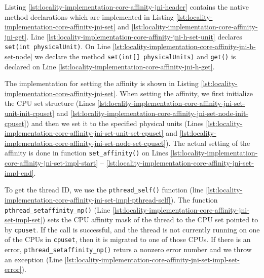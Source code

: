 

Listing \ref{lst:locality-implementation-core-affinity-jni-header}
contains the native method declarations which are implemented in
Listing \ref{lst:locality-implementation-core-affinity-jni-set} and
\ref{lst:locality-implementation-core-affinity-jni-get}. Line
\ref{lst:locality-implementation-core-affinity-jni-h-set-unit}
declares \lstinline!set(int physicalUnit)!. On Line
\ref{lst:locality-implementation-core-affinity-jni-h-set-node} we
declare the method \lstinline!set(int[] physicalUnits)! and
\lstinline!get()! is declared on Line
\ref{lst:locality-implementation-core-affinity-jni-h-get}.





The implementation for setting the affinity is shown in Listing
\ref{lst:locality-implementation-core-affinity-jni-set}. When setting
the affinity, we first initialize the CPU set structure (Lines
\ref{lst:locality-implementation-core-affinity-jni-set-unit-init-cpuset}
and
\ref{lst:locality-implementation-core-affinity-jni-set-node-init-cpuset})
and then we set it to the specified physical units (Lines
\ref{lst:locality-implementation-core-affinity-jni-set-unit-set-cpuset}
and
\ref{lst:locality-implementation-core-affinity-jni-set-node-set-cpuset}). The
actual setting of the affinity is done in function
\lstinline!set_affinity()! on Lines
\ref{lst:locality-implementation-core-affinity-jni-set-impl-start} --
\ref{lst:locality-implementation-core-affinity-jni-set-impl-end}.

To get the thread ID, we use the \lstinline!pthread_self()! function
(line
\ref{lst:locality-implementation-core-affinity-jni-set-impl-pthread-self}). The
function \lstinline!pthread_setaffinity_np()! (Line
\ref{lst:locality-implementation-core-affinity-jni-set-impl-set}) sets
the CPU affinity mask of the thread to the CPU set pointed to by
\lstinline!cpuset!.  If the call is successful, and the thread is not
currently running on one of the CPUs in \lstinline!cpuset!, then it is
migrated to one of those CPUs. If there is an error,
\lstinline!pthread_setaffinity_np()!  returs a nonzero error number
and we throw an exception (Line
\ref{lst:locality-implementation-core-affinity-jni-set-impl-set-error}).

